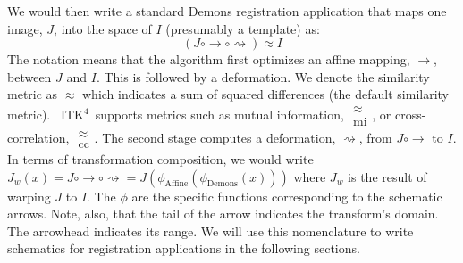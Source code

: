 \documentclass{llncs}
\newcommand{\tk}{~ITK$^{\text{4}}$~}
\begin{document}
We would then write a standard Demons registration application that maps 
one image, $J$, into the space of $I$ (presumably a template) as:
$$
(J \circ \rightarrow \circ \rightsquigarrow ) \approx I
$$
The notation means that the algorithm first optimizes an affine
mapping, $ \rightarrow$, 
between $J$ and $I$.  This is followed by a deformation.  We denote the similarity metric as $\approx$
which indicates a sum of squared differences (the
default similarity metric).  \tk supports metrics such as mutual information, $\substack{
   \approx \\
   \text{mi}
  }$, or cross-correlation, $\substack{
   \approx \\
   \text{cc}
  }$.
The second stage computes a deformation, $\rightsquigarrow$, from $J \circ \rightarrow $
to $I$.  In terms of transformation composition, we would write
$J_w(x) =J \circ \rightarrow \circ \rightsquigarrow =
J( \phi_\text{Affine} ( \phi_\text{Demons} ( x) )) $ where $J_w$ is the
result of warping $J$ to $I$.  The $\phi$ are the specific
functions corresponding to the schematic arrows.
Note, also, that the tail of the arrow indicates the
transform's domain.  The arrowhead indicates its range.  We will use
this nomenclature to write schematics for registration applications in
the following sections.
\end{document}
